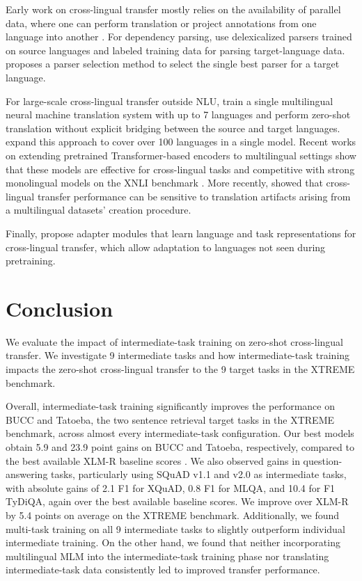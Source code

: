 \documentclass[11pt,a4paper]{article}
\begin{document}
Early work on cross-lingual transfer mostly relies on the availability of parallel data, where one can perform translation \citep{mayhew-etal-2017-cheap} or project annotations from one language into another  \citep{hwa-etal-projection,agic-etal-2016-multilingual}. For dependency parsing, \citet{mcdonald-etal-2011-multi} use delexicalized parsers trained on source languages and labeled training data for parsing target-language data. \citet{agic-2017-cross} proposes a parser selection method to select the single best parser for a target language.

For large-scale cross-lingual transfer outside NLU, \citet{johnson-etal-2017-googles} train a single multilingual neural machine translation system with up to 7 languages and perform zero-shot translation without explicit bridging between the source and target languages. \citet{aharoni2019massively} expand this approach to cover over 100 languages in a single model. Recent works on extending pretrained Transformer-based encoders to multilingual settings show that these models are effective for cross-lingual tasks and competitive with strong monolingual models on the XNLI benchmark \citep{devlin-etal-2019-bert,lample2019cross,conneau2019xlmr,huang-etal-2019-unicoder}. More recently, \citet{artetxe2020translation} showed that cross-lingual transfer performance can be sensitive to translation artifacts arising from a multilingual datasets' creation procedure.

Finally, \citet{pfeiffer2020madx} propose adapter modules that learn language and task representations for cross-lingual transfer, which allow adaptation to languages not seen during pretraining.

\section{Conclusion}

We evaluate the impact of intermediate-task training on zero-shot cross-lingual transfer.
We investigate 9 intermediate tasks and how intermediate-task training impacts the zero-shot cross-lingual transfer to the 9 target tasks in the XTREME benchmark.

Overall, intermediate-task training significantly improves the performance on BUCC and Tatoeba, the two sentence retrieval target tasks in the XTREME benchmark, across almost every intermediate-task configuration.
Our best models obtain 5.9 and 23.9 point gains on BUCC and Tatoeba, respectively, compared to the best available XLM-R baseline scores \citep{hu2020xtreme}.
We also observed gains in question-answering tasks, particularly using SQuAD v1.1 and v2.0 as intermediate tasks, with absolute gains of 2.1 F1 for {XQuAD}, 0.8 F1 for {MLQA}, and 10.4 for F1 {TyDiQA}, again over the best available baseline scores.
We improve over XLM-R by 5.4 points on average on the XTREME benchmark.
Additionally, we found  multi-task training on all 9 intermediate tasks to slightly outperform individual intermediate training. On the other hand, we found that neither incorporating multilingual MLM into the intermediate-task training phase nor translating intermediate-task data consistently led to improved transfer performance.
\end{document}
